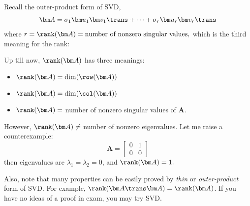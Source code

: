 Recall the outer-product form of SVD, 
\[
\bm A=\sigma_1\bm u_1\bm v_1\trans+\dots+\sigma_r\bm u_r\bm v_r\trans
\]
where $r=\rank(\bm A)=\text{number of nonzero singular values,}$ which is the third meaning for the rank:
\begin{remark}
Up till now, $\rank(\bm A)$ has three meanings:
\begin{itemize}
\item
$\rank(\bm A)=\dim(\row(\bm A))$
\item
$\rank(\bm A)=\dim(\col(\bm A))$
\item
$\rank(\bm A)=$ number of nonzero singular values of $\bm A$.
\end{itemize}
\end{remark}


\begin{remark}
However, $\rank(\bm A)\ne$ number of nonzero eigenvalues. Let me raise a counterexample:
\[
\bm A=\begin{bmatrix}
0&1\\0&0
\end{bmatrix}
\]
then eigenvalues are $\lambda_1=\lambda_2=0$, and $\rank(\bm A)=1.$
\end{remark}
\begin{remark}
Also, note that many properties can be easily proved by \emph{thin} or \emph{outer-product} form of	SVD. For example, $\rank(\bm A\trans\bm A)=\rank(\bm A)$. If you have no ideas of a proof in exam, you may try SVD.
\end{remark}




